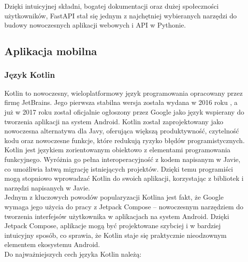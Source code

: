 \documentclass[12pt]{article}
\begin{document}
Dzięki intuicyjnej składni, bogatej dokumentacji oraz dużej społeczności użytkowników, FastAPI stał się jednym z najchętniej wybieranych narzędzi
do budowy nowoczesnych aplikacji webowych i API w Pythonie.

\subsection{Aplikacja mobilna}

\subsubsection{Język Kotlin}
Kotlin to nowoczesny, wieloplatformowy język programowania opracowany przez firmę JetBrains. Jego pierwsza stabilna wersja została wydana w 2016 roku \cite{kotlin-data-wydania},
a już w 2017 roku został oficjalnie ogłoszony przez Google jako język wspierany do tworzenia aplikacji na system Android.
Kotlin został zaprojektowany jako nowoczesna alternatywa dla Javy, oferująca większą produktywność, czytelność kodu oraz nowoczesne funkcje,
które redukują ryzyko błędów programistycznych.\\
Kotlin jest językiem zorientowanym obiektowo z elementami programowania funkcyjnego. Wyróżnia go pełna interoperacyjność z kodem napisanym w Javie,
co umożliwia łatwą migrację istniejących projektów. Dzięki temu programiści mogą stopniowo wprowadzać Kotlin do swoich aplikacji,
korzystając z bibliotek i narzędzi napisanych w Javie.\\
Jednym z kluczowych powodów popularyzacji Kotlina jest fakt, że Google wymaga jego użycia do pracy z Jetpack Compose – nowoczesnym narzędziem
do tworzenia interfejsów użytkownika w aplikacjach na system Android. Dzięki Jetpack Compose, aplikacje mogą być projektowane szybciej i w bardziej intuicyjny sposób,
co sprawia, że Kotlin staje się praktycznie nieodzownym elementem ekosystemu Android.\\
Do najważniejszych cech języka Kotlin należą:
\end{document}
